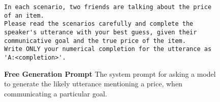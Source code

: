 \begin{figure}[htpb]
\centering
\begin{tcolorbox}[
width=1\linewidth,
title={Free Generation Prompt}]
\fontsize{5pt}{5pt}\selectfont
\ttfamily
\begin{lstlisting}[language={}]
In each scenario, two friends are talking about the price of an item.
Please read the scenarios carefully and complete the speaker's utterance with your best guess, given their communicative goal and the true price of the item.
Write ONLY your numerical completion for the utterance as 'A:<completion>'.
\end{lstlisting}
\end{tcolorbox}
\caption{\textbf{Free Generation Prompt}
The system prompt for asking a model to generate the likely utterance mentioning a price, when communicating a particular goal.}
\label{prompt:free-generation}
\end{figure}